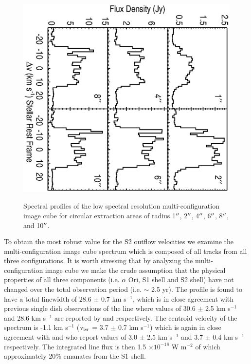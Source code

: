 \documentclass[iop]{emulateapj}
\begin{document}
\begin{figure}
\includegraphics[scale=0.75, angle=90, width=13.0cm, height=11cm, trim=20pt 50pt 20pt 40pt]{f2.eps}
\caption{Spectral profiles of the low spectral resolution multi-configuration image cube for circular extraction areas of radius 1$\mbox{$^{\prime\prime}$}$, 2$\mbox{$^{\prime\prime}$}$, 4$\mbox{$^{\prime\prime}$}$, 6$\mbox{$^{\prime\prime}$}$, 8$\mbox{$^{\prime\prime}$}$, and 10$\mbox{$^{\prime\prime}$}$.}
\label{fig:fig2}
\end{figure}

To obtain the most robust value for the S2 outflow velocities we examine the multi-configuration image cube spectrum which is composed of all tracks from all three configurations. It is worth stressing that by analyzing the multi-configuration image cube we make the crude assumption that the physical properties of all three components (i.e. $\alpha$ Ori, S1 shell and S2 shell) have not changed over the total observation period (i.e. $\sim$ 2.5 yr). The profile is found to have a total linewidth of 28.6 $\pm$ 0.7 km s${}^{-1}$, which is in close agreement with previous single dish observations of the line where values of 30.6 $\pm$ 2.5 km s${}^{-1}$ and 28.6 km s${}^{-1}$ are reported by \cite{1980ApJ...242L..25K} and \cite{1987ApJ...313..400H} respectively. The centroid velocity of the spectrum is  -1.1 km s${}^{-1}$ ($\rm{v_{lsr}}$ = 3.7 $\pm$ 0.7 km s${}^{-1}$) which is again in close agreement with \cite{1980ApJ...242L..25K} and \cite{1987ApJ...313..400H} who report values of 3.0 $\pm$ 2.5 km s${}^{-1}$ and 3.7 $\pm$ 0.4 km s${}^{-1}$ respectively. The integrated line flux is then 1.5 $\times 10^{-18}$ W m$^{-2}$ of which approximately 20\% emanates from the S1 shell.
\end{document}
